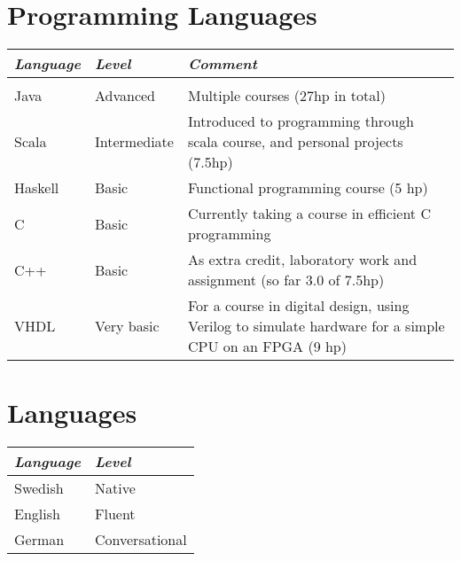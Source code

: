 \documentclass{cv}
\begin{document}
\section{Programming Languages}
\begin{tabular*}{\textwidth}{p{2.7cm}   p{3.7cm} p{11cm}  }
	\textit{Language} & \textit{Level} & \textit{Comment} \\ \hline \\
	
	Java  	& Advanced 	   & Multiple courses (27hp in total)  \\
	Scala 	& Intermediate & Introduced to programming through scala course, and personal projects (7.5hp)\\
	Haskell & Basic        & Functional programming course (5 hp) \\
	C 		& Basic        & Currently taking a course in efficient C programming \\
	C++ 	& Basic        & As extra credit, laboratory work and assignment (so far 3.0 of 7.5hp) \\
	VHDL 	& Very basic   & For a course in digital design, using Verilog to simulate hardware for a simple CPU on an FPGA (9 hp) \\
	
	\end{tabular*}

\section{Languages}

\begin{tabular*}{\textwidth}{p{2.7cm}   p{3.7cm}  }
	\textit{Language} & \textit{Level}  \\ \hline
	Swedish & Native  			\\
	English & Fluent  			\\
	German  & Conversational	\\
\end{tabular*}
\end{document}
